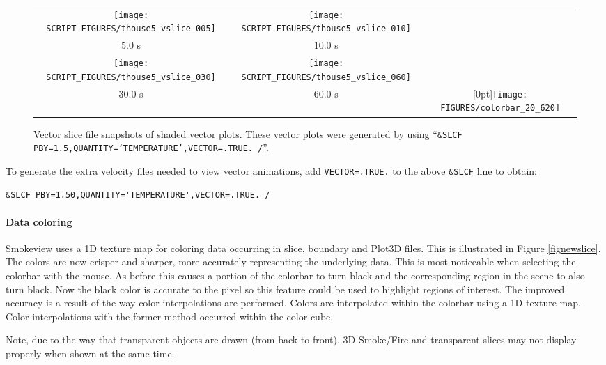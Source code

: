\documentclass[11pt,twoside]{book}
\begin{document}
\begin{figure}[\figoptions]
\begin{center}
\begin{tabular}{ccc}
\texttt{[image: SCRIPT\_FIGURES/thouse5\_vslice\_005]}&
\texttt{[image: SCRIPT\_FIGURES/thouse5\_vslice\_010]}\\
5.0 s&10.0 s\\
\texttt{[image: SCRIPT\_FIGURES/thouse5\_vslice\_030]}&
\texttt{[image: SCRIPT\_FIGURES/thouse5\_vslice\_060]}\\
30.0 s&60.0 s
&\raisebox{0.0ex}[0pt]{\texttt{[image: FIGURES/colorbar\_20\_620]}}\\
\end{tabular}
\end{center}
\caption [Vector slice file snapshots of shaded vector plots.]
{Vector slice file snapshots of shaded vector plots. These vector
plots were generated by using ``{\tt \&SLCF
PBY=1.5,QUANTITY='TEMPERATURE',VECTOR=.TRUE. /}''.}
\label{figvslice}%
\end{figure}

To generate the extra velocity files needed to view vector
animations, add {\tt VECTOR=.TRUE.} to the above {\tt \&SLCF} line
to obtain:
\begin{lstlisting}
&SLCF PBY=1.50,QUANTITY='TEMPERATURE',VECTOR=.TRUE. /
\end{lstlisting}

\paragraph{Data coloring}Smokeview uses a 1D texture map for coloring data occurring in
slice, boundary and Plot3D files. This is illustrated in Figure
\ref{fignewslice}.  The colors are now crisper and sharper, more
accurately representing the underlying data. This is most
noticeable when selecting the colorbar with the mouse. As before
this causes a portion of the colorbar to turn black and the
corresponding region in the scene to also turn black.  Now the
black color is accurate to the pixel so this feature could be used
to highlight regions of interest. The improved accuracy is a
result of the way color interpolations are performed.  Colors
are interpolated within the colorbar using a 1D texture map.  Color interpolations with
the former method occurred within the color cube.

Note, due to the way that transparent objects are drawn (from back to front),
3D Smoke/Fire and transparent slices may not display
properly when shown at the same time.
\end{document}
